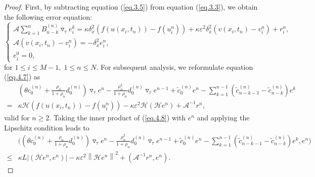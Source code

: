 \documentclass{siamart171218}
\theoremstyle{remark}
\theoremstyle{example}
\numberwithin{equation}{section}
\begin{document}
\begin{proof}
First, by subtracting equation (\ref{eq.3.5}) from equation
 (\ref{eq.3.3}), we obtain the following error equation:
\begin{equation}\label{eq.4.7}
\begin{cases}
\mathscr{A} \sum\limits_{k=1}^{n}B_{n-k}^{(n)} \triangledown_\tau e_i^k = \kappa \delta_x^2 \left(f(u(x_i,t_n))-f(u_i^n)\right)
+ \kappa \varepsilon^2 \delta_x^2 \left(v(x_i,t_n)- v_i^n\right) + r_{i}^{n}, \\
\mathscr{A} \left(v(x_i,t_n)- v_i^n\right) = -\delta_x^2 e_i^n, \\
e_{i}^{0} = 0,
\end{cases}
\end{equation}
for $1\leq i \leq M-1, \; 1\leq n \leq N$.
For subsequent analysis, we reformulate equation (\ref{eq.4.7}) as
\begin{equation}\label{eq.4.8}
\begin{aligned}
&\left( \theta c_{0}^{(n)}+ \frac{\rho_{n}}{1+\rho_{n}}d_{0}^{(n)} \right) \triangledown_\tau e^{n} - \frac{\rho_{n}^2}{1+\rho_{n}}d_{0}^{(n)} \triangledown_\tau e^{n-1} + \widetilde{c}_{0}^{(n)} e^{n}
- \sum\limits_{k=1}^{n-1} \left( \widetilde{c}_{n-k-1}^{(n)} - \widetilde{c}_{n-k}^{(n)} \right) e^{k} \\
= &\kappa \mathcal{H} \left(f\left(u\left(x_i,t_n\right)\right)
-f\left(u_i^n\right)\right) - \kappa
\varepsilon^2 \mathcal{H} \left(\mathcal{H} e^n\right) + \mathscr{A}^{-1}r^n,
\end{aligned}
\end{equation}
valid for $n \geq 2$.
Taking the inner product of (\ref{eq.4.8}) with $e^n$ and applying the Lipschitz condition leads to
\begin{equation}\label{eq.4.9}
\begin{aligned}
&\Bigg(\left(\theta c_{0}^{(n)} + \frac{\rho_{n}}{1+\rho_{n}}d_{0}^{(n)}\right) \triangledown_\tau e^{n} - \frac{\rho_{n}^2}{1+\rho_{n}}d_{0}^{(n)} \triangledown_\tau e^{n-1}
+ \widetilde{c}_{0}^{(n)} e^{n} - \sum_{k=1}^{n-1} \left(\widetilde{c}_{n-k-1}^{(n)} - \widetilde{c}_{n-k}^{(n)}\right) e^{k}, e^n\Bigg) \\
\leq &\kappa L|\left(\mathcal{H} e^n,e^n\right)| - \kappa \varepsilon^2
\left\|\mathcal{H} e^n\right\|^2 + \left(\mathscr{A}^{-1}r^n, e^n\right).
\end{aligned}
\end{equation}


\end{proof}
\end{document}
